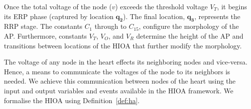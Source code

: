 Once the total voltage of the node ($v$) exceeds the threshold voltage
$V_{T}$, it begins its \ac{ERP} phase (captured by location
$\mathbf{q_2}$). The final location, $\mathbf{q_3}$, represents the
\ac{RRP} stage.  The constants $C_1$ through to $C_{15}$, configure the
morphology of the \ac{AP}. Furthermore, constants $V_T$, $V_O$, and
$V_R$ determine the height of the \ac{AP} and transitions between
locations of the \ac{HIOA} that further modify the morphology.

The voltage of any node in the heart effects its neighboring nodes and
vice-versa. Hence, a means to communicate the voltages of the node to
its neighbors is needed. We achieve this communication between nodes of
the heart using the input and output variables and events available in
the \ac{HIOA} framework. We formalise the \ac{HIOA} using
Definition~\ref{def:ha}.


